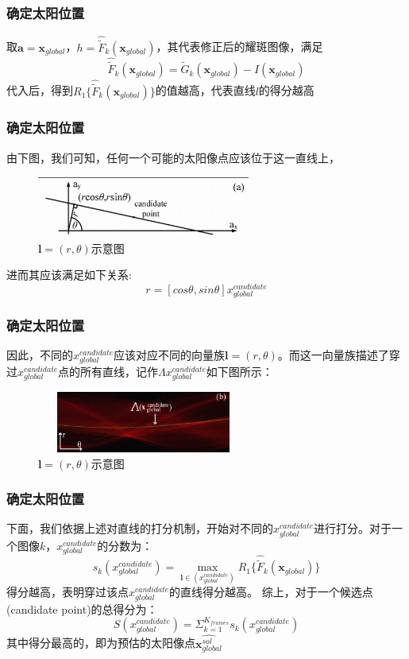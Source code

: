 \documentclass{beamer}
\begin{document}
\begin{frame}
\frametitle{确定太阳位置}
取$\textbf{a}=\textbf{x}_{global}$，$h=\hat{\widetilde{F}}_k(\textbf{x}_{global})$，其代表修正后的耀斑图像，满足
\begin{equation}
\hat{\widetilde{F}}_k(\textbf{x}_{global})=\widetilde{G}_k(\textbf{x}_{global})-I(\textbf{x}_{global})
\end{equation}
代入后，得到$R_1\{\hat{\widetilde{F}}_k(\textbf{x}_{global})\}$的值越高，代表直线$l$的得分越高
\end{frame}
\begin{frame}
\frametitle{确定太阳位置}
由下图，我们可知，任何一个可能的太阳像点应该位于这一直线上，
\begin{figure}[!h]
\centering
\includegraphics[height=2cm,width=7cm]{2022120502.png}
\caption{$\textbf{l}=(r,\theta)$示意图}
\end{figure}
进而其应该满足如下关系:
\begin{equation}
r=[cos\theta,sin\theta]x_{global}^{candidate}
\end{equation}
\end{frame}
\begin{frame}
\frametitle{确定太阳位置}
因此，不同的$x_{global}^{candidate}$应该对应不同的向量族$\textbf{l}=(r,\theta)$。而这一向量族描述了穿过$x_{global}^{candidate}$点的所有直线，记作$\Lambda x_{global}^{candidate}$如下图所示：
\begin{figure}[!h]
\centering
\includegraphics[height=2cm,width=7cm]{2022120504.png}
\caption{$\textbf{l}=(r,\theta)$示意图}
\end{figure}
\end{frame}
\begin{frame}
\frametitle{确定太阳位置}
下面，我们依据上述对直线的打分机制，开始对不同的$x_{global}^{candidate}$进行打分。对于一个图像$k$，$x_{global}^{candidate}$的分数为：
\begin{equation}
s_k(x_{global}^{candidate})=\max_{\textbf{l}\in(x_{global}^{candidate})}R_1\{\hat{\widetilde{F}}_k(\textbf{x}_{global})\}
\end{equation}
得分越高，表明穿过该点$x_{global}^{candidate}$的直线得分越高。
综上，对于一个候选点(candidate point)的总得分为：
\begin{equation}
S(x_{global}^{candidate})=\Sigma_{k=1}^{K_{frames}}s_k(x_{global}^{candidate})\end{equation}
其中得分最高的，即为预估的太阳像点$\hat{\textbf{x}_{global}^{sol}}$
\end{frame}
\end{document}
